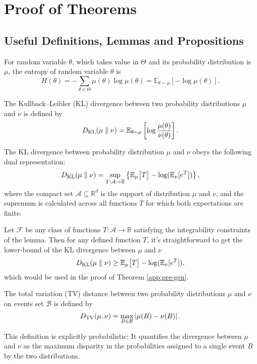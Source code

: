 \section{Proof of Theorems}
\subsection{Useful Definitions, Lemmas and Propositions}
\begin{definition}[Entropy]\label{def:Entropy} For random variable $\theta$, which takes value in $\Theta$ and its probability distribution is $\mu$, the entropy of random variable $\theta$ is
	$$H(\theta)=-\sum_{\theta \in \Theta}\mu(\theta)\log \mu(\theta)=\mathbb{E}_{\theta \sim \mu}\left[-\log \mu(\theta)\right].$$
\end{definition}

\begin{definition}\label{def:KL} The Kullback–Leibler (KL) divergence between two probability distributions $\mu$ and $\nu$ is defined by
	$$D_{\mathrm{KL}}(\mu \parallel \nu)=\mathbb{E}_{\theta\sim\mu}\left[\log\frac{\mu(\theta)}{\nu(\theta)}\right].$$
\end{definition}

\begin{lemma}
	\label{lemma:Donsker-ieq}
	The KL divergence between probability distribution $\mu$ and $\nu$ obeys the following dual representation:
	$$
	D_{\mathrm{KL}}(\mu\parallel \nu)=\sup_{T: \mathcal{A} \rightarrow \mathbb{R}}\left\{\mathbb{E}_\mu\big[T\big]-\log(\mathbb{E}_\nu[e^T])\right\},
	$$
	where the compact set $\mathcal{A} \subseteq \mathbb{R}^d$ is the support of distribution $\mu$ and $\nu$, and the supremum is calculated across all functions $T$ for which both expectations are finite.
\end{lemma}

Let $\mathcal{F}$ be any class of functions $T:\mathcal{A} \rightarrow \mathbb{R}$ satisfying the integrability constraints of the lemma. Then for any defined function $T$, it's straightforward to get the lower-bound of the KL divergence between $\mu$ and $\nu$
$$
D_{\mathrm{KL}}(\mu\parallel \nu) \geq \mathbb{E}_\mu\big[T\big]-\log(\mathbb{E}_\nu[e^T]),
$$
which would be used in the proof of Theorem \ref{app:pre-gen}.


\begin{definition}\label{def:TV-distance} The total variation (TV) distance between two probability distributions $\mu$ and $\nu$ on events set $\mathcal{B}$ is defined by
	$$D_{\mathrm{TV}}(\mu,\nu)=\max_{B\in\mathcal{B}}\left|\mu(B)-\nu(B)\right|.$$
\end{definition}
This definition is explicitly probabilistic: It quantifies the divergence between $\mu$ and $\nu$ as the maximum disparity in the probabilities assigned to a single event $B$ by the two distributions.

